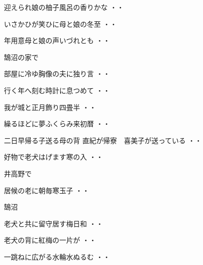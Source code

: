 \begin{shiika}迎えられ娘の柚子風呂の香りかな
\hfill{・・}\end{shiika}
\vspace{0.6cm}
\begin{shiika}いさかひが笑ひに母と娘の冬至
\hfill{・・}\end{shiika}
\vspace{0.6cm}
\begin{shiika}年用意母と娘の声いづれとも
\hfill{・・}\end{shiika}
\vspace{0.6cm}
鵠沼の家で
\begin{shiika}部屋に冷ゆ胸像の夫に独り言
\hfill{・・}\end{shiika}
\begin{shiika}行く年へ刻む時計に息つめて
\hfill{・・}\end{shiika}
\begin{shiika}我が城と正月飾り四畳半
\hfill{・・}\end{shiika}
\begin{shiika}繰るほどに夢ふくらみ来初暦
\hfill{・・}\end{shiika}
\begin{shiika}二日早帰る子送る母の背
\qquad\qquad\qquad \qquad 直紀が帰寮　喜美子が送っている
\hfill{・・}\end{shiika}
\begin{shiika}好物で老犬はげます寒の入
\hfill{・・}\end{shiika}
\vspace{0.6cm}
井高野で
\begin{shiika}居候の老に朝毎寒玉子
\hfill{・・}\end{shiika}
\vspace{0.6cm}
鵠沼
\begin{shiika}老犬と共に留守居す梅日和
\hfill{・・}\end{shiika}
\begin{shiika}老犬の背に紅梅の一片が
\hfill{・・}\end{shiika}
\begin{shiika}一跳ねに広がる水輪水ぬるむ
\hfill{・・}\end{shiika}
